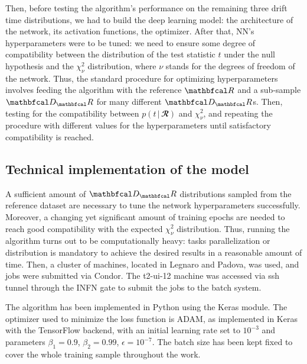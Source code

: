 Then, before testing the algorithm's performance on the remaining three drift time distributions, we had to build the
deep learning model: the architecture of the network, its activation functions, the optimizer. After that, NN's
hyperparameters were to be tuned: we need to ensure some degree of compatibility between the distribution of the test
statistic $t$ under the null hypothesis and the $\chi^{2}_{\nu}$ distribution, where $\nu$ stands for the degrees of
freedom of the network. Thus, the standard procedure for optimizing hyperparameters involves feeding the algorithm with
the reference $\R$ and a sub-sample $\D_\R$ for many different $\D_\R$s. Then, testing for the compatibility between
$p(t\,|\,\mathbfcal{R})$ and $\chi^{2}_{\nu}$, and repeating the procedure with different values for the hyperparameters
until satisfactory compatibility is reached. 

\subsection{Technical implementation of the model}

A sufficient amount of $\D_\R$ distributions sampled from the reference dataset are necessary to tune the network
hyperparameters successfully. Moreover, a changing yet significant amount of training epochs are needed to reach good
compatibility with the expected $\chi^2_{\nu}$ distribution. Thus, running the algorithm turns out to be computationally
heavy: tasks parallelization or distribution is mandatory to achieve the desired results in a reasonable amount of time.
Then, a cluster of machines, located in Legnaro and Padova, was used, and jobs were submitted via Condor. The t2-ui-12
machine was accessed via ssh tunnel through the INFN gate to submit the jobs to the batch system.

The algorithm has been implemented in Python using the Keras module. The optimizer used to minimize the loss function is
ADAM, as implemented in Keras with the TensorFlow backend, with an initial learning rate set to $10^{-3}$ and parameters
$\beta_1=0.9$, $\beta_2=0.99$, $\epsilon=10^{-7}$. The batch size has been kept fixed to cover the whole training sample
throughout the work. 

\begin{figure}[h]
    \centering
    
    \label{fig:net}
\end{figure}  

